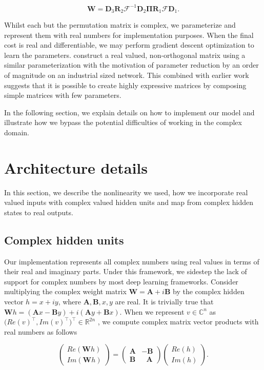 \documentclass{article} %
\newcommand{\matr}[1]{\mathbf{#1}}
\newcommand\RR{\mathbb{R}}
\newcommand\CC{\mathbb{C}}
\begin{document}
\begin{equation} \matr{W} = \matr{D}_3 \matr{R}_2 \mathcal{F}^{-1} \matr{D}_2 \matr{\Pi} \matr{R}_1 \mathcal{F} \matr{D}_1 .\end{equation}

Whilst each but the permutation matrix is complex, we parameterize and represent them with real numbers
for implementation purposes. When the final cost is real and differentiable, we may perform gradient descent 
optimization to learn the parameters.
\cite{dfc} construct a real valued, non-orthogonal matrix using a similar parameterization with the motivation
of parameter reduction by an order of magnitude on an industrial sized network. This combined with earlier
work \citep{fastfood} suggests that it is possible to create highly expressive matrices by composing simple
matrices with few parameters.

In the following section, we explain details on how to implement our model and illustrate how we bypass the
potential difficulties of working in the complex domain.

\section{Architecture details}
\label{sec:impl}

In this section, we describe the nonlinearity we used, how we incorporate real valued inputs 
with complex valued hidden units and map from complex hidden states to real outputs. 

\subsection{Complex hidden units}

Our implementation represents all complex numbers using real values in terms of their
real and imaginary parts. Under this framework, we sidestep the lack of support for complex numbers 
by most deep learning frameworks. Consider multiplying the complex weight matrix 
$\matr{W} = \matr{A} + i \matr{B}$ by the complex hidden vector $h = x + i y$, where
$\matr{A}, \matr{B}, x, y$ are real.
It is trivially true that $\matr{W}h = (\matr{A}x - \matr{B}y) + i (\matr{A}y + \matr{B}x)$.
When we represent $v \in \CC^n$ as $\big(Re(v)^\top, Im(v)^\top \big)^\top \in \RR^{2n}$ , we
compute complex matrix vector products with real numbers as follows

\begin{equation} \begin{pmatrix} Re(\matr{W}h) \\ Im(\matr{W}h) \end{pmatrix}  
= \begin{pmatrix} \matr{A} & -\matr{B} \\ \matr{B} & \ \ \ 
\matr{A} \end{pmatrix} \begin{pmatrix} Re(h) \\ Im(h) \end{pmatrix} .
\end{equation}
\end{document}
